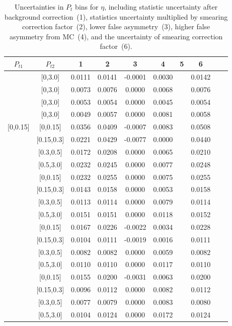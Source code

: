 \begin{table}[H]\scriptsize
\centering
\begin{tabular}{|c| c| c| c| c| c| c| c| c| c|}
\hline
$P_{t1}$ & $P_{t2}$ & 1 & 2 & 3 & 4& 5& 6 \\ \hline
[0,0.15]	&	[0,3.0]	&	0.0111	&	0.0141	&	-0.0001	&	0.0030	&		&	0.0142	\\ \hline
[0.15,0.3]	&	[0,3.0]	&	0.0073	&	0.0076	&	0.0000	&	0.0068	&		&	0.0076	\\ \hline
[0.3,0.5]	&	[0,3.0]	&	0.0053	&	0.0054	&	0.0000	&	0.0045	&		&	0.0054	\\ \hline
[0.5,3.0]	&	[0,3.0]	&	0.0049	&	0.0057	&	0.0000	&	0.0081	&		&	0.0058	\\ \hline
															
[0,0.15]	&	[0,0.15]	&	0.0356	&	0.0409	&	-0.0007	&	0.0083	&		&	0.0508	\\ \hline
[0,0.15]	&	[0.15,0.3]	&	0.0221	&	0.0429	&	-0.0077	&	0.0000	&		&	0.0440	\\ \hline
[0,0.15]	&	[0.3,0.5]	&	0.0172	&	0.0208	&	0.0000	&	0.0065	&		&	0.0210	\\ \hline
[0,0.15]	&	[0.5,3.0]	&	0.0232	&	0.0245	&	0.0000	&	0.0077	&		&	0.0248	\\ \hline
[0.15,0.3]	&	[0,0.15]	&	0.0232	&	0.0255	&	0.0000	&	0.0075	&		&	0.0255	\\ \hline
[0.15,0.3]	&	[0.15,0.3]	&	0.0143	&	0.0158	&	0.0000	&	0.0053	&		&	0.0158	\\ \hline
[0.15,0.3]	&	[0.3,0.5]	&	0.0113	&	0.0114	&	0.0000	&	0.0079	&		&	0.0114	\\ \hline
[0.15,0.3]	&	[0.5,3.0]	&	0.0151	&	0.0151	&	0.0000	&	0.0118	&		&	0.0152	\\ \hline
[0.3,0.5]	&	[0,0.15]	&	0.0167	&	0.0226	&	-0.0022	&	0.0034	&		&	0.0228	\\ \hline
[0.3,0.5]	&	[0.15,0.3]	&	0.0104	&	0.0111	&	-0.0019	&	0.0016	&		&	0.0111	\\ \hline
[0.3,0.5]	&	[0.3,0.5]	&	0.0082	&	0.0082	&	0.0000	&	0.0059	&		&	0.0082	\\ \hline
[0.3,0.5]	&	[0.5,3.0]	&	0.0110	&	0.0110	&	0.0000	&	0.0117	&		&	0.0110	\\ \hline
[0.5,3.0]	&	[0,0.15]	&	0.0155	&	0.0200	&	-0.0031	&	0.0063	&		&	0.0200	\\ \hline
[0.5,3.0]	&	[0.15,0.3]	&	0.0096	&	0.0112	&	0.0000	&	0.0082	&		&	0.0112	\\ \hline
[0.5,3.0]	&	[0.3,0.5]	&	0.0077	&	0.0079	&	0.0000	&	0.0083	&		&	0.0080	\\ \hline
[0.5,3.0]	&	[0.5,3.0]	&	0.0104	&	0.0124	&	0.0000	&	0.0172	&		&	0.0124	\\ \hline
\end{tabular}
\caption{Uncertainties in $P_t$ bins for $\eta$, including statistic uncertainty after background correction~(1), statistics uncertainty multiplied by smearing correction factor~(2), lower false asymmetry~(3), higher false asymmetry from MC~(4), and the uncertainty of smearing correction factor~(6).}
\label{tab:etaerrors_pt}
\end{table}

